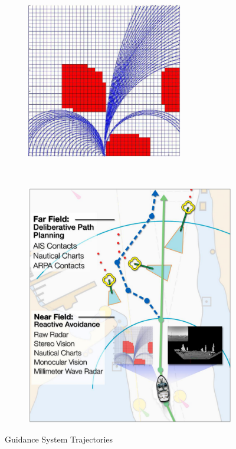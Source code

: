     \begin{figure}[t!]
    \centering
    
        \begin{subfigure}[t]{0.35\textwidth}
            \centering
            \includegraphics[width=0.75\textwidth]{figs/Chap3/Larson2006Autonomous_Arcs.png}
            \label{fig:Larson2006Autonomous_Arcs}
        \end{subfigure}%
        ~ 
        \begin{subfigure}[t]{0.6\textwidth}
            \centering
            \includegraphics[width=\textwidth]{figs/Chap3/Larson2006Automated_Summary.png}
            \label{fig:Larson2006Automated_Summary}
        \end{subfigure}
        
    \caption{Guidance System Trajectories \cite{Larson2006Autonomous}}
    \end{figure}
